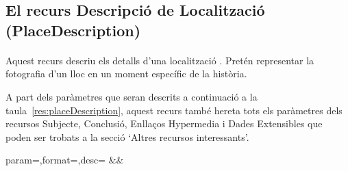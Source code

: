 \subsection{El recurs Descripció de Localització (PlaceDescription)}

    \paragraph{}
    Aquest recurs descriu els detalls d'una localització . Pretén representar la fotografia d'un lloc en un moment específic de la història.

    A part dels paràmetres que seran descrits a continuació a la taula~\ref{res:placeDescription}, aquest recurs també hereta tots els paràmetres dels recursos Subjecte, Conclusió, Enllaços Hypermedia i Dades Extensibles que poden ser trobats a la secció `Altres recursos interessants'.

    \begin{center}
             {param=\param,format=\format,desc=\desc}
             {\param&\format&\desc}
     \end{center}
